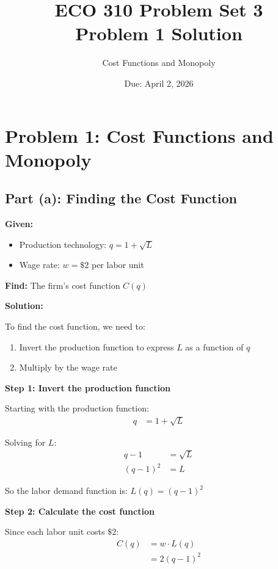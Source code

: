 \documentclass[11pt]{article}
\title{ECO 310 Problem Set 3 \\ Problem 1 Solution}
\author{Cost Functions and Monopoly}
\date{Due: April 2, 2026}
\begin{document}
\maketitle

\section*{Problem 1: Cost Functions and Monopoly}

\subsection*{Part (a): Finding the Cost Function}

\textbf{Given:}
\begin{itemize}
    \item Production technology: $q = 1 + \sqrt{L}$
    \item Wage rate: $w = \$2$ per labor unit
\end{itemize}

\textbf{Find:} The firm's cost function $C(q)$

\vspace{0.3cm}

\textbf{Solution:}

To find the cost function, we need to:
\begin{enumerate}
    \item Invert the production function to express $L$ as a function of $q$
    \item Multiply by the wage rate
\end{enumerate}

\textbf{Step 1: Invert the production function}

Starting with the production function:
\begin{align*}
    q &= 1 + \sqrt{L}
\end{align*}

Solving for $L$:
\begin{align*}
    q - 1 &= \sqrt{L} \\
    (q - 1)^2 &= L
\end{align*}

So the labor demand function is: $L(q) = (q - 1)^2$

\textbf{Step 2: Calculate the cost function}

Since each labor unit costs $\$2$:
\begin{align*}
    C(q) &= w \cdot L(q) \\
    &= 2(q - 1)^2
\end{align*}
\end{document}
